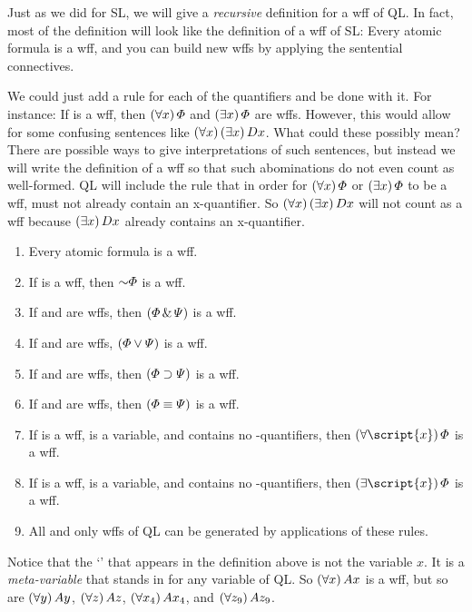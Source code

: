 Just as we did for SL, we will give a \emph{recursive} definition for a wff of QL. In fact, most of the definition will look like the definition of a wff of SL: Every atomic formula is a wff, and you can build new wffs by applying the sentential connectives.

We could just add a rule for each of the quantifiers and be done with it. For instance: If \metaA{} is a wff, then $(\forall x) \,\varPhi{}$ and $(\exists x) \,\varPhi{}$ are wffs. However, this would allow for some confusing sentences like $(\forall x) \,(\exists x) \, Dx$. What could these possibly mean? There are possible ways to give interpretations of such sentences, but instead we will write the definition of a wff so that such abominations do not even count as well-formed. QL will include the rule that in order for $(\forall x) \,\varPhi{}$ or $(\exists x) \,\varPhi{}$ to be a wff, \metaA{} must not already contain an x-quantifier. So $(\forall x) \, (\exists x) \, Dx$ will not count as a wff because $(\exists x) \, Dx$ already contains an x-quantifier.

\begin{enumerate}
\item Every atomic formula is a wff.
\item If \metaA{} is a wff, then $\enot\metaA{}$ is a wff.
\item If \metaA{} and \metaB{} are wffs, then $(\varPhi{}\,\&\,\varPsi{})$ is a wff.
\item If \metaA{} and \metaB{} are wffs, $(\varPhi{}\vee\varPsi{})$ is a wff.
\item If \metaA{} and \metaB{} are wffs, then $(\varPhi{}\supset\varPsi{})$ is a wff.
\item If \metaA{} and \metaB{} are wffs, then $(\varPhi{}\equiv\varPsi{})$ is a wff.
\item If \metaA{} is a wff,  is a variable, and \metaA{} contains no -quantifiers, then $\qt{\forall}{\script{x}}\metaA{}$ is a wff.
\item If \metaA{} is a wff,  is a variable, and \metaA{} contains no -quantifiers, then $\qt{\exists}{\script{x}}\metaA{}$ is a wff.
\item All and only wffs of QL can be generated by applications of these rules.
\end {enumerate}

Notice that the `' that appears in the definition above is not the variable $x$. It is a \emph{meta-variable} that stands in for any variable of QL. So $(\forall x) \,Ax$ is a wff, but so are $(\forall y) \,Ay$, $(\forall z) \,Az$, $(\forall x_4) \,Ax_4$, and $(\forall z_9) \, Az_9$.

